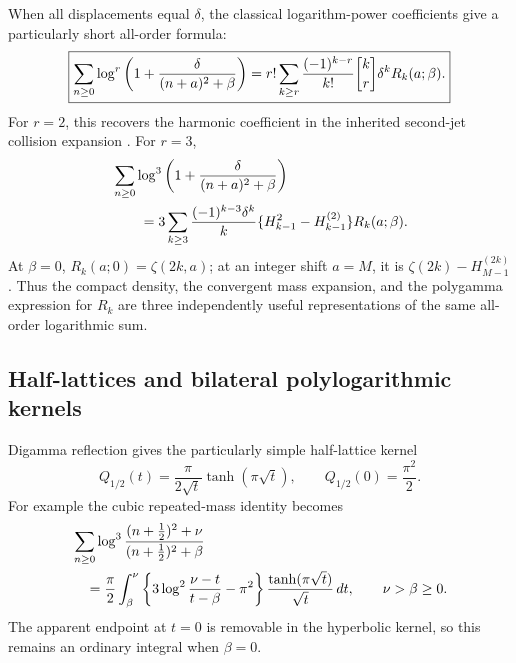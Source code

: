 When all displacements equal \(\delta\), the classical logarithm-power
coefficients give a particularly short all-order formula:
\begin{equation}\label{da:confluent-stirling}
 \boxed{\displaystyle
 \sum_{n\ge0}\log^r\left(1+\frac{\delta}{(n+a)^2+\beta}\right)
   =r!\sum_{k\ge r}\frac{(-1)^{k-r}}{k!}\stir kr
                          \delta^kR_k(a;\beta).}
\end{equation}
For \(r=2\), this recovers the harmonic coefficient in the inherited
second-jet collision expansion \cite{ProveItHigherDefects}. For \(r=3\),
\begin{align}
 &\sum_{n\ge0}\log^3\left(1+\frac{\delta}{(n+a)^2+\beta}\right)\notag\\
 &\qquad=
 3\sum_{k\ge3}\frac{(-1)^{k-3}\delta^k}{k}
       \{H_{k-1}^2-H_{k-1}^{(2)}\}R_k(a;\beta).
 \label{da:cubic-harmonic}
\end{align}
At \(\beta=0\), \(R_k(a;0)=\zeta(2k,a)\); at an integer shift
\(a=M\), it is \(\zeta(2k)-H_{M-1}^{(2k)}\).
Thus the compact density, the convergent mass expansion, and the
polygamma expression for \(R_k\) are three independently useful
representations of the same all-order logarithmic sum.

\subsection{Half-lattices and bilateral polylogarithmic kernels}

Digamma reflection gives the particularly simple half-lattice kernel
\begin{equation}\label{da:half-lattice}
 Q_{1/2}(t)=\frac{\pi}{2\sqrt t}\tanh(\pi\sqrt t),
 \qquad Q_{1/2}(0)=\frac{\pi^2}{2}.
\end{equation}
For example the cubic repeated-mass identity becomes
\begin{align}
 &\sum_{n\ge0}\log^3
    \frac{(n+\frac12)^2+\nu}{(n+\frac12)^2+\beta}\notag\\
 &\quad=\frac{\pi}{2}\int_\beta^\nu
    \left\{3\log^2\frac{\nu-t}{t-\beta}-\pi^2\right\}
                  \frac{\tanh(\pi\sqrt t)}{\sqrt t}\,d t,
       \qquad \nu>\beta\ge0 .
 \label{da:half-cubic}
\end{align}
The apparent endpoint at \(t=0\) is removable in the hyperbolic kernel,
so this remains an ordinary integral when \(\beta=0\).

